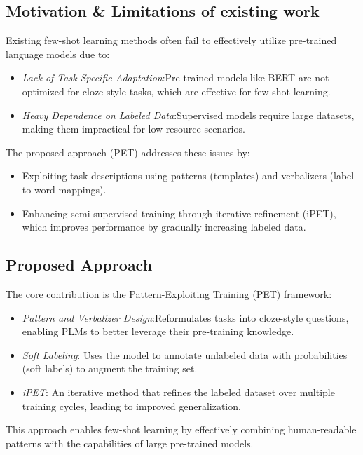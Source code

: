 \documentclass[11pt,a4paper]{article}
\begin{document}
            \subsection{Motivation \& Limitations of existing work} 
            Existing few-shot learning methods often fail to effectively utilize pre-trained language models due to:
            \begin{itemize}[topsep=0pt]
              \item \textit{Lack of Task-Specific Adaptation}:Pre-trained models like BERT are not optimized for cloze-style tasks, which are effective for few-shot learning. 
              \item \textit{Heavy Dependence on Labeled Data}:Supervised models require large datasets, making them impractical for low-resource scenarios.
            \end{itemize} 
            The proposed approach (PET) addresses these issues by:
            \begin{itemize}[topsep=0pt]
              \item Exploiting task descriptions using patterns (templates) and verbalizers (label-to-word mappings). 
              \item Enhancing semi-supervised training through iterative refinement (iPET), which improves performance by gradually increasing labeled data. 
            \end{itemize}
            \subsection{Proposed Approach} 
            The core contribution is the Pattern-Exploiting Training (PET) framework: 
            \begin{itemize}[topsep=0pt]
              \setlength\itemsep{0em}
              \item \textit{Pattern and Verbalizer Design}:Reformulates tasks into cloze-style questions, enabling PLMs to better leverage their pre-training knowledge. 
              \item \textit{Soft Labeling}: Uses the model to annotate unlabeled data with probabilities (soft labels) to augment the training set.
              \item \textit{iPET}: An iterative method that refines the labeled dataset over multiple training cycles, leading to improved generalization. 
            \end{itemize}
            This approach enables few-shot learning by effectively combining human-readable patterns with the capabilities of large pre-trained models. 
\end{document}
